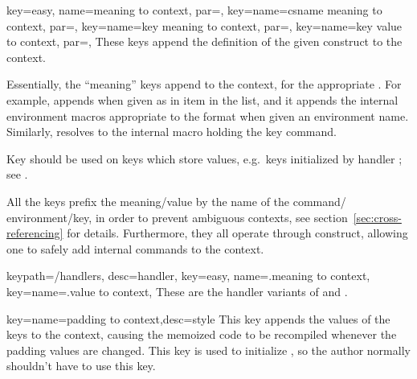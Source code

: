 \documentclass[a4paper,11pt]{article}
\begin{document}
\begin{doc}{
    key={easy, name=meaning to context,
      par=},
    key={name=csname meaning to context, par=},
    key={name=key meaning to context,
      par=},
    key={name=key value to context,
      par=},
  }
  These keys append the definition of the given construct to the context.

  Essentially, the ``meaning'' keys append 
  to the context, for the appropriate .  For example,
   appends  when given 
  as in item in the list, and it appends the internal environment macros
  appropriate to the format when given an environment name.  Similarly,
   resolves  to the
  internal macro holding the key command.

  Key  should be used on keys which store values,
  e.g.\ keys initialized by  handler ; see
  .

  All the keys prefix the meaning\slash value by the name of the command\slash
  environment\slash key, in order to prevent ambiguous contexts, see
  section~\ref{sec:cross-referencing} for details.  Furthermore, they all
  operate through  construct, allowing one
  to safely add internal commands to the context.
\end{doc}

\begin{doc}{
    keypath={/handlers}, desc=handler,
    key={easy, name=.meaning to context},
    key={name=.value to context},
  }
  These are the handler variants of  and
  .
\end{doc}


\begin{doc}{key={name=padding to context,desc=style}}
  This key appends the values of the  keys to the context,
  causing the memoized code to be recompiled whenever the padding values are
  changed.  This key is used to initialize , so the author
  normally shouldn't have to use this key.
\end{doc}
\end{document}
